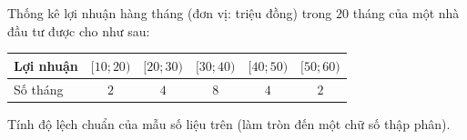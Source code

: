 \begin{bt}%

	Thống kê lợi nhuận hàng tháng (đơn vị: triệu đồng) trong $20$ tháng của một nhà đầu tư được cho như sau:
	\begin{center}
		\begin{tabular}{|l|c|c|c|c|c|}
			\hline Lợi nhuận & {$[10 ; 20)$} & {$[20 ; 30)$} & {$[30 ; 40)$} & {$[40 ; 50)$} & {$[50 ; 60)$} \\
			\hline Số tháng & $2$ & $4$ & $8$ & $4$ & $2$ \\
			\hline
		\end{tabular}
	\end{center}
	Tính độ lệch chuẩn của mẫu số liệu trên (làm tròn đến một chữ số thập phân).
\end{bt}

